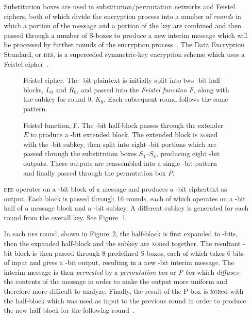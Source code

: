 \documentclass[a4paper,10pt,twoside,openright]{book}
\renewcommand{\sc}[1]{\textsc{\lowercase{#1}}}
\renewcommand{\ln}[1]{{\fontsize{8pt}{8pt}\selectfont#1}}
\begin{document}
Substitution boxes are used in substitution\-/permutation networks and Feistel ciphers, both of which divide the encryption process into a number of \textit{rounds} in which a portion of the message and a portion of the key are combined and then passed through a number of S-boxes to produce a new interim message which will be processed by further rounds of the encryption process~\cite{crypto}. The Data Encryption Standard, or \sc{DES}, is a superceded symmetric-key encryption scheme which uses a Feistel cipher~\cite{blahut2014cryptography}.
\begin{figure}
    \centering
    
    \caption[Feistel cipher]{Feistel cipher. The \ln{64}-bit plaintext is initially split into two \ln{32}-bit half-blocks, $L_0$ and $R_0$, and passed into the \textit{Feistel function} $F$, along with the subkey for round $0$, $K_0$. Each subsequent round follows the same pattern.}
    \label{fig:feistel}
\end{figure}

\begin{figure}
    \centering
    
    \caption[Feistel function]{Feistel function, F. The \ln{32}-bit half-block passes through the extender $E$ to produce a \ln{48}-bit extended block. The extended block is \sc{XOR}ed with the \ln{48}-bit subkey, then split into eight \ln{6}-bit portions which are passed through the substitution boxes $S_1$--$S_8$, producing eight \ln{4}-bit outputs. These outputs are reassembled into a single \ln{32}-bit pattern and finally passed through the permutation box $P$.}
    \label{fig:desround}
\end{figure}

\sc{DES} operates on a \ln{64}-bit block of a message and produces a \ln{64}-bit ciphertext as output. Each block is passed through 16 rounds, each of which operates on a \ln{32}-bit half of a message block and a \ln{48}-bit subkey. A different subkey is generated for each round from the overall key. See Figure~\ref{fig:feistel}.

In each \sc{DES} round, shown in Figure~\ref{fig:desround}, the half-block is first expanded to \ln{48}-bits, then the expanded half-block and the subkey are \sc{XOR}ed together. The resultant \ln{48}-bit block is then passed through 8 predefined S-boxes, each of which takes 6 bits of input and gives a \ln{4}-bit output, resulting in a new \ln{32}-bit interim message. The interim message is then \textit{permuted} by a \textit{permutation box} or \textit{P-box} which \textit{diffuses} the contents of the message in order to make the output more uniform and therefore more difficult to analyze. Finally, the result of the P-box is \sc{XOR}ed with the half-block which was used as input to the previous round in order to produce the new half-block for the following round~\cite{biham}.
\end{document}
